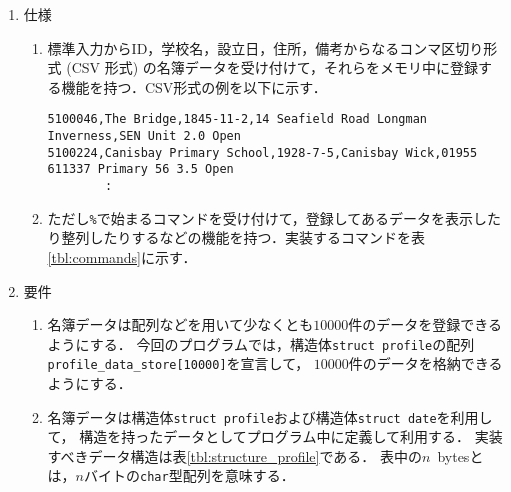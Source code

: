 \documentclass[a4j,11pt]{jarticle}
\begin{document}
\begin{enumerate}
\setlength{\parskip}{0mm}\setlength{\itemsep}{0mm}%
\item 仕様
    \begin{enumerate}
    \item 標準入力からID，学校名，設立日，住所，備考からなるコンマ区切り形式 (CSV 形式) の名簿データを受け付けて，それらをメモリ中に登録する機能を持つ．CSV形式の例を以下に示す．

    {\fontsize{8pt}{10pt} \selectfont
        \begin{verbatim}
5100046,The Bridge,1845-11-2,14 Seafield Road Longman Inverness,SEN Unit 2.0 Open
5100224,Canisbay Primary School,1928-7-5,Canisbay Wick,01955 611337 Primary 56 3.5 Open
        :
        \end{verbatim}
    }

    \item ただし\verb|%|で始まるコマンドを受け付けて，登録してあるデータを表示したり整列したりするなどの機能を持つ．実装するコマンドを表\ref{tbl:commands}に示す．
    \end{enumerate}
\item 要件
    \begin{enumerate}
    \item 名簿データは配列などを用いて少なくとも$10000$件のデータを登録できるようにする．
          今回のプログラムでは，構造体\verb|struct profile|の配列\verb|profile_data_store[10000]|を宣言して，
          $10000$件のデータを格納できるようにする．
    \item 名簿データは構造体\verb|struct profile|および構造体\verb|struct date|を利用して，
          構造を持ったデータとしてプログラム中に定義して利用する．
          実装すべきデータ構造は表\ref{tbl:structure_profile}である．
          表中の$n$~bytesとは，$n$バイトの\verb|char|型配列を意味する．
    \end{enumerate}
\end{enumerate}
\end{document}
